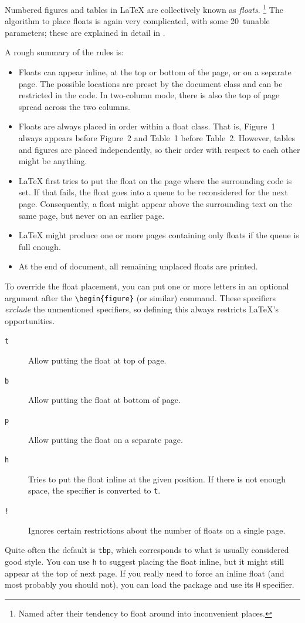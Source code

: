 Numbered figures and tables in \LaTeX{} are collectively known as \emph{floats}.%
%
\footnote{Named after their tendency to float around into inconvenient places.}
The algorithm to place floats is again very complicated,
with some 20~tunable parameters;
these are explained in detail in \cite[Chapter~7.1]{TLC}.

A rough summary of the rules is:
\begin{itemize}
\item Floats can appear inline, at the top or bottom of the page, or on a separate page.
    The possible locations are preset by the document class
    and can be restricted in the code.
    In two-column mode, there is also the top of page spread across the two columns.
\item Floats are always placed in order within a float class.
    That is, Figure~1 always appears before Figure~2 and Table~1 before Table~2.
    However, tables and figures are placed independently,
    so their order with respect to each other might be anything.
\item \LaTeX{} first tries to put the float on the page where the surrounding code is set.
    If that fails, the float goes into a queue to be reconsidered for the next page.
    Consequently, a float might appear above the surrounding text on the same page,
    but never on an earlier page.
\item \LaTeX{} might produce one or more pages containing only floats if the queue is full enough.
\item At the end of document, all remaining unplaced floats are printed.
\end{itemize}

To override the float placement, you can put one or more letters in an optional argument
after the \verb|\begin{figure}| (or similar) command.
These specifiers \emph{exclude} the unmentioned specifiers,
so defining this always restricts \LaTeX's opportunities.
\begin{description}
\item[\texttt{t}] Allow putting the float at top of page.
\item[\texttt{b}] Allow putting the float at bottom of page.
\item[\texttt{p}] Allow putting the float on a separate page.
\item[\texttt{h}] Tries to put the float inline at the given position.
    If there is not enough space, the specifier is converted to \verb|t|.
\item[\texttt{!}] Ignores certain restrictions about the number of floats on a single page.
\end{description}
%
Quite often the default is \verb|tbp|, which corresponds to what is usually considered good style.
You can use \verb|h| to suggest placing the float inline, but it might still appear
at the top of next page.
If you really need to force an inline float (and most probably you should not),
you can load the  package and use its \verb|H| specifier.

